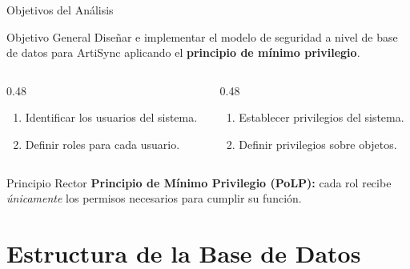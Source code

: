 \documentclass[aspectratio=169]{beamer}
\begin{document}
\begin{frame}{Objetivos del Análisis}
    \begin{block}{Objetivo General}
        Diseñar e implementar el modelo de seguridad a nivel de base de datos para ArtiSync aplicando el \textbf{principio de mínimo privilegio}.
    \end{block}
    \vspace{0.3cm}
    \begin{columns}[T]
        \begin{column}{0.48\textwidth}
            \begin{enumerate}
                \item[\faUsers] Identificar los usuarios del sistema.
                \item[\faUserShield] Definir roles para cada usuario.
            \end{enumerate}
        \end{column}
        \begin{column}{0.48\textwidth}
            \begin{enumerate}
                \item[\faCog] Establecer privilegios del sistema.
                \item[\faLock] Definir privilegios sobre objetos.
            \end{enumerate}
        \end{column}
    \end{columns}
    \vspace{0.3cm}
    \begin{alertblock}{Principio Rector}
        \centering \textbf{Principio de Mínimo Privilegio (PoLP):} cada rol recibe \textit{únicamente} los permisos necesarios para cumplir su función.
    \end{alertblock}
\end{frame}

\section{Estructura de la Base de Datos}
\end{document}
